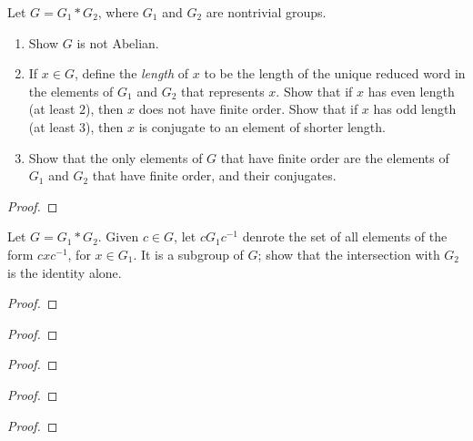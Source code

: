 \newpage
\begin{problem}[Munkres \S69, Ex.\,2(a,b,c)]
Let $G=G_1*G_2$, where $G_1$ and $G_2$ are nontrivial groups.
\begin{enumerate}[label=(\alph*)]
\item Show $G$ is not Abelian.
\item If $x\in G$, define the \emph{length} of $x$ to be the length of the
  unique reduced word in the elements of $G_1$ and $G_2$ that represents
  $x$. Show that if $x$ has even length (at least $2$), then $x$ does not
  have finite order. Show that if $x$ has odd length (at least $3$), then
  $x$ is conjugate to an element of shorter length.
\item Show that the only elements of $G$ that have finite order are the
  elements of $G_1$ and $G_2$ that have finite order, and their
  conjugates.
\end{enumerate}
\end{problem}
\begin{proof}
\end{proof}
\newpage
\begin{problem}[Munkres \S69, Ex.\,3]
Let $G=G_1*G_2$. Given $c\in G$, let $cG_1c^{-1}$ denrote the set of all
elements of the form $cxc^{-1}$, for $x\in G_1$. It is a subgroup of $G$;
show that the intersection with $G_2$ is the identity alone.
\end{problem}
\begin{proof}
\end{proof}
\newpage
\begin{problem}
\end{problem}
\begin{proof}
\end{proof}
\newpage
\begin{problem}
\end{problem}
\begin{proof}
\end{proof}
\newpage
\begin{problem}
\end{problem}
\begin{proof}
\end{proof}
\newpage
\begin{problem}
\end{problem}
\begin{proof}
\end{proof}

